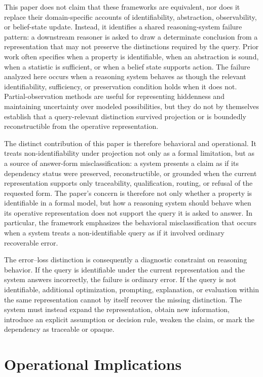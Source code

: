 \documentclass[11pt]{article}
\begin{document}
This paper does not claim that these frameworks are equivalent, nor does it replace their domain-specific accounts of identifiability, abstraction, observability, or belief-state update. Instead, it identifies a shared reasoning-system failure pattern: a downstream reasoner is asked to draw a determinate conclusion from a representation that may not preserve the distinctions required by the query. Prior work often specifies when a property is identifiable, when an abstraction is sound, when a statistic is sufficient, or when a belief state supports action. The failure analyzed here occurs when a reasoning system behaves as though the relevant identifiability, sufficiency, or preservation condition holds when it does not. Partial-observation methods are useful for representing hiddenness and maintaining uncertainty over modeled possibilities, but they do not by themselves establish that a query-relevant distinction survived projection or is boundedly reconstructible from the operative representation.

The distinct contribution of this paper is therefore behavioral and operational. It treats non-identifiability under projection not only as a formal limitation, but as a source of answer-form misclassification: a system presents a claim as if its dependency status were preserved, reconstructible, or grounded when the current representation supports only traceability, qualification, routing, or refusal of the requested form. The paper's concern is therefore not only whether a property is identifiable in a formal model, but how a reasoning system should behave when its operative representation does not support the query it is asked to answer. In particular, the framework emphasizes the behavioral misclassification that occurs when a system treats a non-identifiable query as if it involved ordinary recoverable error.

The error--loss distinction is consequently a diagnostic constraint on reasoning behavior. If the query is identifiable under the current representation and the system answers incorrectly, the failure is ordinary error. If the query is not identifiable, additional optimization, prompting, explanation, or evaluation within the same representation cannot by itself recover the missing distinction. The system must instead expand the representation, obtain new information, introduce an explicit assumption or decision rule, weaken the claim, or mark the dependency as traceable or opaque.

\section{Operational Implications}
\end{document}
